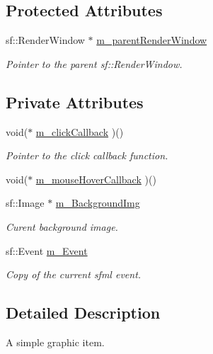 \subsection*{Protected Attributes}
\begin{CompactItemize}
\item 
sf::RenderWindow $\ast$ \hyperlink{classObject_a8afe2c64c045d58821a6af77803c630}{m\_\-parentRenderWindow}
\begin{CompactList}\small\item\em Pointer to the parent sf::RenderWindow. \item\end{CompactList}\end{CompactItemize}
\subsection*{Private Attributes}
\begin{CompactItemize}
\item 
void($\ast$ \hyperlink{classObject_f7caaefc35c7091fcaab49a102394239}{m\_\-clickCallback} )()
\begin{CompactList}\small\item\em Pointer to the click callback function. \item\end{CompactList}\item 
void($\ast$ \hyperlink{classObject_b26d3ace4076898316d25c7d056ab80f}{m\_\-mouseHoverCallback} )()
\item 
sf::Image $\ast$ \hyperlink{classObject_e961607134fe49c270e312f3107bf569}{m\_\-BackgroundImg}
\begin{CompactList}\small\item\em Curent background image. \item\end{CompactList}\item 
sf::Event \hyperlink{classObject_5ded1f794f837d393cf30fc8ecfceb37}{m\_\-Event}
\begin{CompactList}\small\item\em Copy of the current sfml event. \item\end{CompactList}\end{CompactItemize}


\subsection{Detailed Description}
A simple graphic item. 

